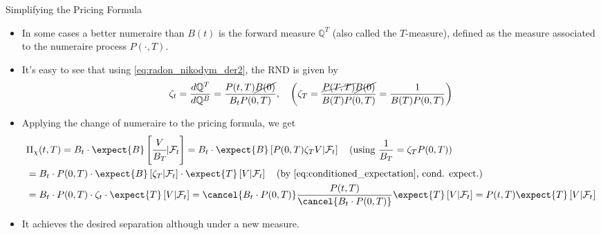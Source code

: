 \documentclass{beamer}
\begin{document}
\begin{frame}{Simplifying the Pricing Formula}
	\begin{itemize}
		\item  In some cases a better numeraire than $B(t)$ is the \textcolor{maincolor}{forward measure} $\mathbb{Q}^T$ (also called the $T$-measure), defined as the measure associated to the numeraire process $P(\cdot,T)$.
		\item It's easy to see that using \cref{eq:radon_nikodym_der2}, the RND is given by
		\begin{equation}
			\zeta_t = \frac{d\mathbb{Q}^T}{d\mathbb{Q}^B} = \frac{P(t,T)\cancel{B(0)}}{B_t P(0,T)} ,\quad\left(\zeta_T=\frac{\cancel{P(T,T)}\cancel{B(0)}}{B(T)P(0,T)}=\frac{1}{B(T)P(0,T)}\right)
			\label{eq:radon_nikodym_t_forward}
		\end{equation}
		\item Applying the change of numeraire to the pricing formula, we get
		\begin{equation*}
			\begin{aligned}
				&\Pi_\chi(t,T) = B_t\cdot\expect{B}\left[\cfrac{V}{B_T}|\mathcal{F}_t\right]
				= B_t\cdot\expect{B}\left[P(0,T)\zeta_T V|\mathcal{F}_t\right]\quad\text{(using } \frac{1}{B_T} = \zeta_TP(0,T))\\
				& = B_t\cdot P(0,T)\cdot\expect{B}\left[\zeta_T|\mathcal{F}_t\right]\cdot\expect{T}\left[V|\mathcal{F}_t\right]\quad\text{(by \cref{eq:conditioned_expectation}, cond. expect.)}\\
				& = B_t\cdot P(0,T)\cdot\zeta_t\cdot\expect{T}\left[V|\mathcal{F}_t\right] =  \cancel{B_t\cdot P(0,T)}\frac{P(t,T)}{\cancel{B_t\cdot P(0,T)}}\expect{T}\left[V|\mathcal{F}_t\right] = P(t,T)\expect{T}\left[V|\mathcal{F}_t\right]
			\end{aligned}
		\end{equation*}
		\item It achieves the desired separation although under a new measure.
	\end{itemize}
\end{frame}
\end{document}
